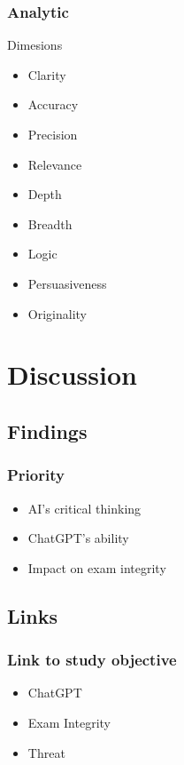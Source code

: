\documentclass{beamer}
\begin{document}
\begin{frame}
    \frametitle{Analytic}
    \begin{block}{Dimesions}
        \begin{multicols}{3}
            \begin{itemize}
                \item<1-> Clarity
                \item<1-> Accuracy
                \item<1-> Precision
                \item<2-> Relevance
                \item<2-> Depth
                \item<2-> Breadth
                \item<3-> Logic
                \item<3-> Persuasiveness
                \item<3-> Originality
            \end{itemize}
        \end{multicols}
    \end{block}
\end{frame}

\section{Discussion}

\subsection{Findings}
\begin{frame}
    \frametitle{Priority}
    \LARGE
    \begin{itemize}
        \item AI's critical thinking
        \item ChatGPT's ability
        \item Impact on exam integrity
    \end{itemize}
\end{frame}

\subsection{Links}
\begin{frame}
    \frametitle{Link to study objective}
    \LARGE
    \begin{itemize}
        \item ChatGPT
        \item Exam Integrity
        \item Threat
    \end{itemize}
\end{frame}
\end{document}
